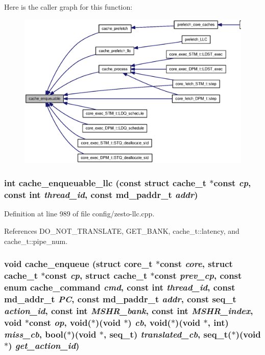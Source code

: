 Here is the caller graph for this function:\nopagebreak
\begin{figure}[H]
\begin{center}
\leavevmode
\includegraphics[width=420pt]{zesto-cache_8h_35c7c82c117f5713ec55d40f831060da_icgraph}
\end{center}
\end{figure}
\subsubsection[{cache\_\-enqueuable\_\-llc}]{\setlength{\rightskip}{0pt plus 5cm}int cache\_\-enqueuable\_\-llc (const struct {\bf cache\_\-t} $\ast$const  {\em cp}, \/  const int {\em thread\_\-id}, \/  const {\bf md\_\-paddr\_\-t} {\em addr})}\label{zesto-cache_8h_17919e2800a0393570b40f08156cb42c}




Definition at line 989 of file config/zesto-llc.cpp.

References DO\_\-NOT\_\-TRANSLATE, GET\_\-BANK, cache\_\-t::latency, and cache\_\-t::pipe\_\-num.
\subsubsection[{cache\_\-enqueue}]{\setlength{\rightskip}{0pt plus 5cm}void cache\_\-enqueue (struct {\bf core\_\-t} $\ast$const  {\em core}, \/  struct {\bf cache\_\-t} $\ast$const  {\em cp}, \/  struct {\bf cache\_\-t} $\ast$const  {\em prev\_\-cp}, \/  const enum {\bf cache\_\-command} {\em cmd}, \/  const int {\em thread\_\-id}, \/  const {\bf md\_\-addr\_\-t} {\em PC}, \/  const {\bf md\_\-paddr\_\-t} {\em addr}, \/  const {\bf seq\_\-t} {\em action\_\-id}, \/  const int {\em MSHR\_\-bank}, \/  const int {\em MSHR\_\-index}, \/  void $\ast$const  {\em op}, \/  void($\ast$)(void $\ast$) {\em cb}, \/  void($\ast$)(void $\ast$, int) {\em miss\_\-cb}, \/  bool($\ast$)(void $\ast$, {\bf seq\_\-t}) {\em translated\_\-cb}, \/  {\bf seq\_\-t}($\ast$)(void $\ast$) {\em get\_\-action\_\-id})}\label{zesto-cache_8h_0831369c0f015a2e350b71f2fc445c70}




